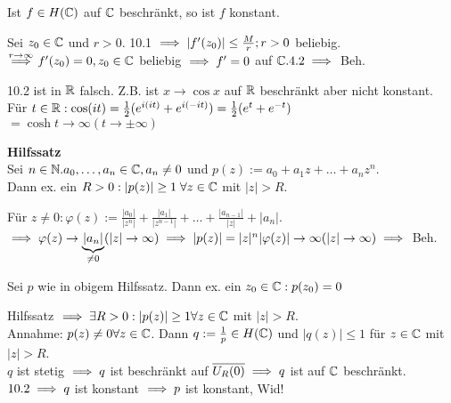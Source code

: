\documentclass[a4paper,twoside,DIV15,BCOR12mm]{scrbook}
\begin{document}
\begin{satz}
Ist $f \in H(\mathbb{C} )$ auf $\mathbb{C}$ beschränkt, so ist $f$ konstant.
\end{satz}

\begin{beweis}
Sei $z_0 \in \mathbb{C}$ und $r > 0$. 10.1 $\implies |f'(z_0)| \leq \frac{M}{r}; r>0$ beliebig. \\
$\stackrel{r \to \infty}{\implies} f'(z_0) = 0, z_0 \in \mathbb{C}$ beliebig $\implies f' = 0$ auf $\mathbb{C}. 4.2 \implies$ Beh.
\end{beweis}

\begin{bemerkung}
10.2 ist in $\mathbb{R}$ falsch. Z.B. ist $x \to \cos x$ auf $\mathbb{R}$ beschränkt aber nicht konstant. Für $t \in \mathbb{R}: \cos (it) = \frac{1}{2}(e^{i(it)} + e^{i(-it)}) = \frac{1}{2}(e^t + e^{-t})$\\ 
$= \cosh t \to \infty (t \to \pm\infty )$
\end{bemerkung}

\textbf{Hilfssatz}\\
Sei $n \in \mathbb{N}. a_0,\ldots ,a_n \in \mathbb{C}, a_n \neq 0$ und $p(z):=a_0 + a_1z + \ldots + a_nz^n$. \\
Dann ex. ein $R>0: |p(z)| \geq 1 \;\forall z \in \mathbb{C}$ mit $|z| > R$.

\begin{beweis}
Für $z \neq 0: \varphi (z) := \frac{|a_0|}{|z^n|} + \frac{|a_1|}{|z^{n-1}|} + \ldots + \frac{|a_{n-1}|}{|z|} + |a_n|$.\\
$\implies \varphi (z) \to \underbrace{|a_n|}_{\neq 0} (|z| \to \infty) \implies |p(z)| = |z|^n |\varphi(z)| \to \infty (|z| \to \infty) \implies$ Beh.
\end{beweis}

\begin{satz}
Sei $p$ wie in obigem Hilfssatz. Dann ex. ein $z_0 \in \mathbb{C}: p(z_0) = 0$
\end{satz}

\begin{beweis}
Hilfssatz $\implies \exists R>0 : |p(z)|\geq 1 \forall z \in \mathbb{C}$ mit $|z|>R$.\\
Annahme: $p(z) \neq 0 \forall z \in \mathbb{C}$. Dann $q:=\frac{1}{p} \in H(\mathbb{C})$ und $|q(z)|\leq 1$ für $z\in \mathbb{C}$ mit $|z| > R$. \\
$q$ ist stetig $\implies q$ ist beschränkt auf $\overline{U_R(0)} \implies q$ ist auf $\mathbb{C}$ beschränkt. \\
$10.2 \implies q$ ist konstant $\implies p$ ist konstant, Wid!
\end{beweis}
\end{document}
